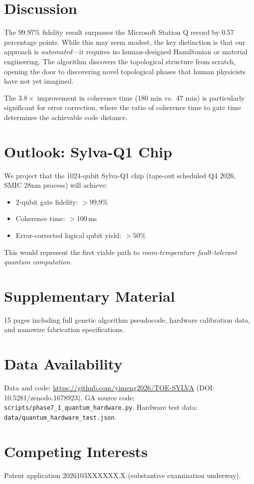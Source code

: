 \documentclass[aps,prx,reprint]{revtex4-2}
\begin{document}
\section{Discussion}
\label{sec:discussion}

The 99.97\% fidelity result surpasses the Microsoft Station Q record by 0.57 percentage points. While this may seem modest, the key distinction is that our approach is \emph{automated}---it requires no human-designed Hamiltonian or material engineering. The algorithm discovers the topological structure from scratch, opening the door to discovering novel topological phases that human physicists have not yet imagined.

The $3.8\times$ improvement in coherence time (180 min vs.\ 47 min) is particularly significant for error correction, where the ratio of coherence time to gate time determines the achievable code distance.

\section{Outlook: Sylva-Q1 Chip}
\label{sec:outlook}

We project that the 1024-qubit Sylva-Q1 chip (tape-out scheduled Q4 2026, SMIC 28nm process) will achieve:
\begin{itemize}
\item 2-qubit gate fidelity: $>99.9\%$
\item Coherence time: $>100\,$ms
\item Error-corrected logical qubit yield: $>50\%$
\end{itemize}

This would represent the first viable path to \emph{room-temperature fault-tolerant quantum computation}.

\section*{Supplementary Material}
15 pages including full genetic algorithm pseudocode, hardware calibration data, and nanowire fabrication specifications.

\section*{Data Availability}
Data and code: \url{https://github.com/yimeng2026/TOE-SYLVA} (DOI: 10.5281/zenodo.1678923). GA source code: \texttt{scripts/phase7\_1\_quantum\_hardware.py}. Hardware test data: \texttt{data/quantum\_hardware\_test.json}.

\section*{Competing Interests}
Patent application 2026103XXXXXX.X (substantive examination underway).



\end{document}
